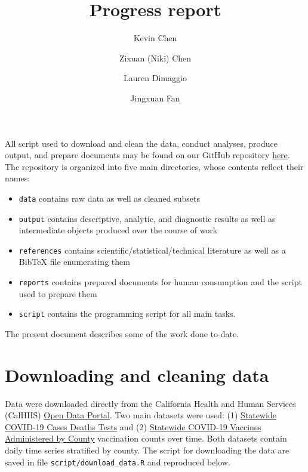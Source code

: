 \documentclass[
  11pt,
  letterpaper,
  DIV=11,
  numbers=noendperiod]{scrartcl}
\title{Progress report}
\author{Kevin Chen \and Zixuan (Niki) Chen \and Lauren
Dimaggio \and Jingxuan Fan}
\date{}
\providecommand{\tightlist}{%
  \setlength{\itemsep}{0pt}\setlength{\parskip}{0pt}}\usepackage{longtable,booktabs,array}
\begin{document}
\maketitle
\ifdefined\Shaded\renewenvironment{Shaded}{\begin{tcolorbox}[sharp corners, frame hidden, borderline west={3pt}{0pt}{shadecolor}, boxrule=0pt, enhanced, interior hidden, breakable]}{\end{tcolorbox}}\fi

All script used to download and clean the data, conduct analyses,
produce output, and prepare documents may be found on our GitHub
repository
\href{https://github.berkeley.edu/kevchen/capstone-epi}{here}. The
repository is organized into five main directories, whose contents
reflect their names:

\begin{itemize}
\tightlist
\item
  \texttt{data} contains raw data as well as cleaned subsets
\item
  \texttt{output} contains descriptive, analytic, and diagnostic results
  as well as intermediate objects produced over the course of work
\item
  \texttt{references} contains scientific/statistical/technical
  literature as well as a BibTeX file enumerating them
\item
  \texttt{reports} contains prepared documents for human consumption and
  the script used to prepare them
\item
  \texttt{script} contains the programming script for all main tasks.
\end{itemize}

The present document describes some of the work done to-date.

\hypertarget{downloading-and-cleaning-data}{%
\section{Downloading and cleaning
data}\label{downloading-and-cleaning-data}}

Data were downloaded directly from the California Health and Human
Services (CalHHS) \href{https://data.chhs.ca.gov}{Open Data Portal}. Two
main datasets were used: (1)
\href{https://data.chhs.ca.gov/dataset/covid-19-time-series-metrics-by-county-and-state}{Statewide
COVID-19 Cases Deaths Tests} and (2)
\href{https://data.chhs.ca.gov/dataset/vaccine-progress-dashboard}{Statewide
COVID-19 Vaccines Administered by County} vaccination counts over time.
Both datasets contain daily time series stratified by county. The script
for downloading the data are saved in file
\texttt{script/download\_data.R} and reproduced below.
\end{document}
